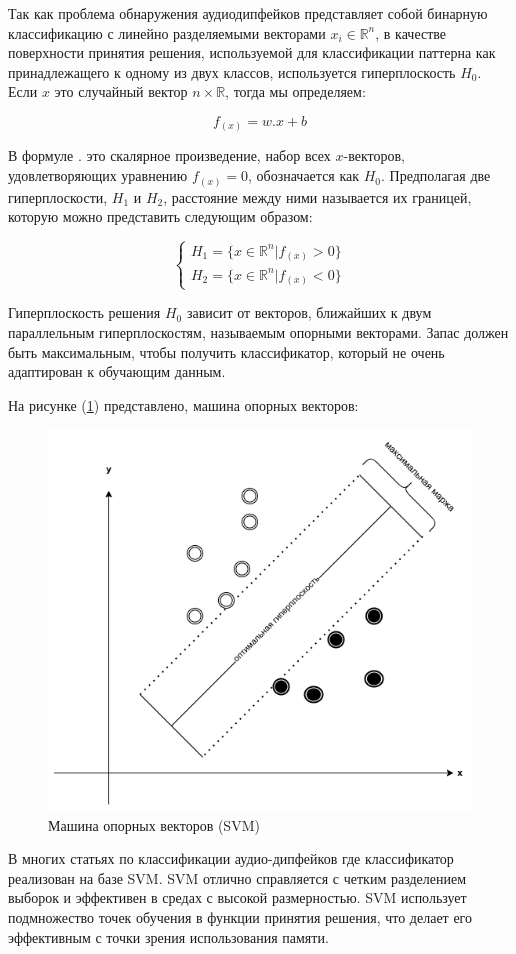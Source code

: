Так как проблема обнаружения аудиодипфейков представляет собой бинарную классификацию с линейно разделяемыми векторами \(x_{i} \in \mathbb{R}^{n}\), в качестве поверхности принятия решения, используемой для классификации паттерна как принадлежащего к одному из двух классов, используется гиперплоскость \(H_{0}\). Если \(x\) это случайный вектор \(n \times \mathbb{R}\), тогда мы определяем:

\[
    f_{(x)} = w.x + b
\]

В формуле \(.\) это скалярное произведение, набор всех \(x\)-векторов, удовлетворяющих уравнению \(f_{(x)} = 0\), обозначается как \(H_{0}\). Предполагая две гиперплоскости, \(H_{1}\) и \(H_{2}\), расстояние между ними называется их границей, которую можно представить следующим образом:

\[
    \begin{cases}
        H_{1} = \{x \in \mathbb{R}^{n} | f_{(x)} > 0\} \\
        H_{2} = \{x \in \mathbb{R}^{n} | f_{(x)} < 0\}
    \end{cases}
\]

Гиперплоскость решения \(H_{0}\) зависит от векторов, ближайших к двум параллельным гиперплоскостям, называемым опорными векторами. Запас должен быть максимальным, чтобы получить классификатор, который не очень адаптирован к обучающим данным.

На рисунке (\ref{fig:support-vector-machine}) представлено, машина опорных векторов: 
\begin{figure}[H]
	\centering
	\includegraphics[width=0.4\linewidth]{images/support-vector-machine.png}
	\caption{Машина опорных векторов (SVM)}
	\label{fig:support-vector-machine}
\end{figure}

В многих статьях по классификации аудио-дипфейков где классификатор реализован на базе SVM. SVM отлично справляется с четким разделением выборок и эффективен в средах с высокой размерностью. SVM использует подмножество точек обучения в функции принятия решения, что делает его эффективным с точки зрения использования памяти.


